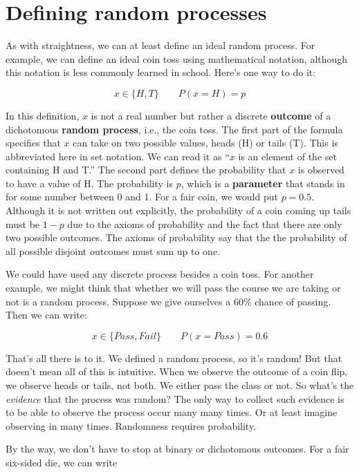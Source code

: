 \documentclass[openany]{book}
\begin{document}
\hypertarget{defining-random-processes}{%
\section{Defining random processes}\label{defining-random-processes}}

As with straightness, we can at least define an ideal random process. For example, we can define an ideal coin toss using mathematical notation, although this notation is less commonly learned in school. Here's one way to do it:

\[ x \in \{H, T\} \qquad P(x=H) = p\]

In this definition, \(x\) is not a real number but rather a discrete \textbf{outcome} of a dichotomous \textbf{random process}, i.e., the coin toss. The first part of the formula specifies that \(x\) can take on two possible values, heads (H) or tails (T). This is abbreviated here in set notation. We can read it as ``\(x\) is an element of the set containing H and T.'' The second part defines the probability that \(x\) is observed to have a value of H. The probability is \(p\), which is a \textbf{parameter} that stands in for some number between 0 and 1. For a fair coin, we would put \(p=0.5\). Although it is not written out explicitly, the probability of a coin coming up tails must be \(1-p\) due to the axioms of probability and the fact that there are only two possible outcomes. The axioms of probability say that the the probability of all possible disjoint outcomes must sum up to one.

We could have used any discrete process besides a coin toss. For another example, we might think that whether we will pass the course we are taking or not is a random process. Suppose we give ourselves a 60\% chance of passing. Then we can write:

\[ x \in \{Pass, Fail\} \qquad P(x=Pass) = 0.6\]

That's all there is to it. We defined a random process, so it's random! But that doesn't mean all of this is intuitive. When we observe the outcome of a coin flip, we observe heads or tails, not both. We either pass the class or not. So what's the \emph{evidence} that the process was random? The only way to collect such evidence is to be able to observe the process occur many many times. Or at least imagine observing in many times. Randomness requires probability.

By the way, we don't have to stop at binary or dichotomous outcomes. For a fair six-sided die, we can write
\end{document}
